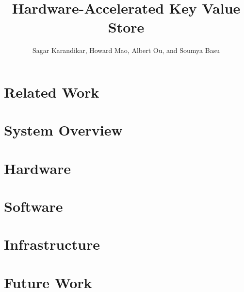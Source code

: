 \documentclass[conference]{IEEEtran}
\title{Hardware-Accelerated Key Value Store}
\author{Sagar Karandikar, Howard Mao, Albert Ou, and Soumya Basu}
\begin{document}
\maketitle





\section{Related Work}



\section{System Overview}



\section{Hardware}




\section{Software}



\section{Infrastructure}





\section{Future Work}




\nocite{*}
\printbibliography
\end{document}
